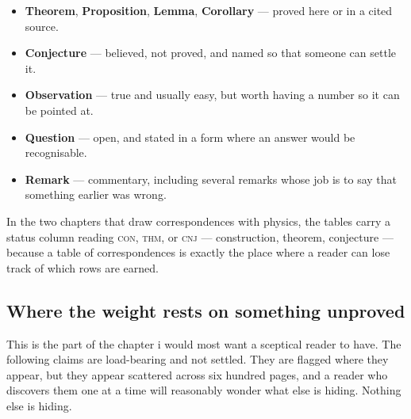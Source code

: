\begin{itemize}[leftmargin=1.6em, itemsep=3pt]
\item \textbf{Theorem}, \textbf{Proposition}, \textbf{Lemma},
      \textbf{Corollary} --- proved here or in a cited source.
\item \textbf{Conjecture} --- believed, not proved, and named so
      that someone can settle it.
\item \textbf{Observation} --- true and usually easy, but worth
      having a number so it can be pointed at.
\item \textbf{Question} --- open, and stated in a form where an
      answer would be recognisable.
\item \textbf{Remark} --- commentary, including several remarks
      whose job is to say that something earlier was wrong.
\end{itemize}

\noindent
In the two chapters that draw correspondences with physics, the
tables carry a status column reading \textsc{con}, \textsc{thm}, or
\textsc{cnj} --- construction, theorem, conjecture --- because a
table of correspondences is exactly the place where a reader can
lose track of which rows are earned.

\subsection*{Where the weight rests on something unproved}

This is the part of the chapter i would most want a sceptical
reader to have.
The following claims are load-bearing and not settled.
They are flagged where they appear, but they appear scattered
across six hundred pages, and a reader who discovers them one at a
time will reasonably wonder what else is hiding.
Nothing else is hiding.

